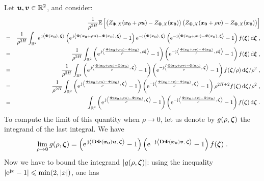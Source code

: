 \documentclass{elsarticle}
\begin{document}
Let $ \bm{u},\bm{v}\in\mathbb{R}^2$, and consider:
\begin{eqnarray*}
&&\frac{1}{\rho^{2H}}\mathbb{E}\left[\left(Z_{\mathbf{\Phi},X}(\bm{x_0}+\rho \bm{u})-Z_{\mathbf{\Phi},X}(\bm{x_0})\right)\left(Z_{\mathbf{\Phi},X}(\bm{x_0}+\rho \bm{v})-Z_{\mathbf{\Phi},X}(\bm{x_0})\right)\right]\\
&=&\frac{1}{\rho^{2H}} \int_{\mathbb{R}^2}\mathrm{e}^{\, \mathrm{j} \left \langle \mathbf{\Phi}(\bm{x_0}),\, \bm{\xi}\right \rangle}\left(\mathrm{e}^{\, \mathrm{j} \left \langle \mathbf{\Phi}(\bm{x_0}+\rho \bm{u})-\mathbf{\Phi}(\bm{x_0}),\, \bm{\xi}\right \rangle}-1\right)\mathrm{e}^{-\mathrm{j} \left \langle \mathbf{\Phi}(\bm{x_0}),\, \bm{\xi}\right \rangle}\left(\mathrm{e}^{-\mathrm{j} \left \langle  \mathbf{\Phi}(\bm{x_0}+\rho \bm{v})-\Phi(\bm{x_0}),\, \bm{\xi}\right \rangle}-1\right)f(\bm{\xi})\mathop{}\mathopen{}\mathrm{d} \bm{\xi}\;,\\
&=&\frac{1}{\rho^{2H}} \int_{\mathbb{R}^2}
\left(\mathrm{e}^{\, \mathrm{j} \left \langle \frac{\mathbf{\Phi}(\bm{x_0}+\rho \bm{u})-\mathbf{\Phi}(\bm{x_0})}{\rho},\, \rho \bm{\xi}\right \rangle}-1\right)
\left(\mathrm{e}^{-\mathrm{j} \left \langle \frac{\mathbf{\Phi}(\bm{x_0}+\rho \bm{v})-\mathbf{\Phi}(\bm{x_0})}{\rho},\, \rho \bm{\xi}\right \rangle}-1\right)
f(\bm{\xi})\mathop{}\mathopen{}\mathrm{d} \bm{\xi}\;,\\
&=&\frac{1}{\rho^{2H}} \int_{\mathbb{R}^2}\left(\mathrm{e}^{\, \mathrm{j} \left \langle \frac{\mathbf{\Phi}(\bm{x_0}+\rho \bm{u})-\mathbf{\Phi}(\bm{x_0})}{\rho},\, \bm{\zeta}\right \rangle}-1\right)
\left(\mathrm{e}^{-\mathrm{j} \left \langle \frac{\mathbf{\Phi}(\bm{x_0}+\rho \bm{v})-\mathbf{\Phi}(\bm{x_0})}{\rho},\,  \bm{\zeta}\right \rangle}-1\right)f(\bm{\zeta}/\rho)\mathop{}\mathopen{}\mathrm{d} \bm{\zeta}/\rho^2\;,\\
&=&\frac{1}{\rho^{2H}} \int_{\mathbb{R}^2}\left(\mathrm{e}^{\, \mathrm{j} \left \langle \frac{\mathbf{\Phi}(\bm{x_0}+\rho \bm{u})-\mathbf{\Phi}(\bm{x_0})}{\rho},\, \bm{\zeta}\right \rangle}-1\right)\left(\mathrm{e}^{-\mathrm{j} \left \langle \frac{\mathbf{\Phi}(\bm{x_0}+\rho \bm{v})-\mathbf{\Phi}(\bm{x_0})}{\rho},\,  \bm{\zeta}\right \rangle}-1\right)\rho^{2H+2}f(\bm{\zeta})\mathop{}\mathopen{}\mathrm{d} \bm{\zeta}/\rho^2\;,\\
&=&\int_{\mathbb{R}^2}\left(\mathrm{e}^{\, \mathrm{j} \left \langle \frac{\mathbf{\Phi}(\bm{x_0}+\rho \bm{u})-\mathbf{\Phi}(\bm{x_0})}{\rho},\, \bm{\zeta}\right \rangle}-1\right)\left(\mathrm{e}^{-\mathrm{j} \left \langle \frac{\mathbf{\Phi}(\bm{x_0}+\rho \bm{v})-\mathbf{\Phi}(\bm{x_0})}{\rho},\,  \bm{\zeta}\right \rangle}-1\right)f(\bm{\zeta})\mathop{}\mathopen{}\mathrm{d} \bm{\zeta}\;.
\end{eqnarray*}To compute the limit of this quantity when $\rho \to 0$, let us denote by $g(\rho,\bm{\zeta})$ the integrand of the last integral. We have
\[
\lim_{\rho\to 0}g(\rho,\bm{\zeta})=\left(\mathrm{e}^{\, \mathrm{j} \left \langle  \mathbf{D}\mathbf{\Phi}(\bm{x_0})\bm{u},\, \bm{\zeta}\right \rangle}-1\right)\left(\mathrm{e}^{-\mathrm{j} \left \langle  \mathbf{D}\mathbf{\Phi}(\bm{x_0})\bm{v},\, \bm{\zeta}\right \rangle}-1\right)f(\bm{\zeta})\;.
\]
Now we have to bound the integrand $\lvert g(\rho,\bm{\zeta})\rvert$: using the inequality $\lvert \mathrm{e}^{\mathrm{j} x}-1\rvert\leqslant \min (2,\lvert x\rvert)$, one has
\end{document}
